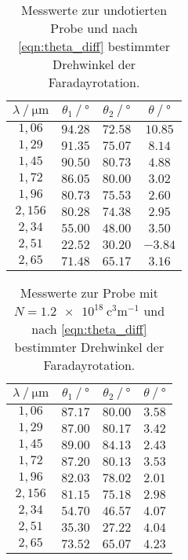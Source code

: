 \begin{table}
  \centering
  \caption{Messwerte zur undotierten Probe und nach \autoref{eqn:theta_diff} bestimmter Drehwinkel der Faradayrotation.}
  \label{tab:mw1}
  \begin{tabular}{c c c c}
    \toprule
    $\lambda \mathbin{/} \unit{\micro\meter}$ & $\theta_{1} \mathbin{/} \unit{\degree}$ & $\theta_{2} \mathbin{/} \unit{\degree}$ &%
     $\theta \mathbin{/} \unit{\degree}$ \\
    \midrule
    $1,06 $ & $94.28$ & $72.58$ & $10.85$ \\
    $1,29 $ & $91.35$ & $75.07$ & $8.14 $ \\
    $1,45 $ & $90.50$ & $80.73$ & $4.88 $ \\
    $1,72 $ & $86.05$ & $80.00$ & $3.02 $ \\
    $1,96 $ & $80.73$ & $75.53$ & $2.60 $ \\
    $2,156$ & $80.28$ & $74.38$ & $2.95 $ \\
    $2,34 $ & $55.00$ & $48.00$ & $3.50 $ \\
    $2,51 $ & $22.52$ & $30.20$ & $-3.84$ \\
    $2,65 $ & $71.48$ & $65.17$ & $3.16 $ \\
    \bottomrule
  \end{tabular}
\end{table}

\begin{table}
  \centering
  \caption{Messwerte zur Probe mit $N = \qty{1.2e18}{\cubic\centi\metre^{-1}}$ und nach \autoref{eqn:theta_diff} bestimmter Drehwinkel der Faradayrotation.}
  \label{tab:mw2}
  \begin{tabular}{c c c c}
    \toprule
    $\lambda \mathbin{/} \unit{\micro\meter}$ & $\theta_{1} \mathbin{/} \unit{\degree}$ & $\theta_{2} \mathbin{/} \unit{\degree}$ &%
     $\theta \mathbin{/} \unit{\degree}$ \\
    \midrule
    $1,06 $ & $87.17$ & $80.00$ & $3.58$ \\
    $1,29 $ & $87.00$ & $80.17$ & $3.42$ \\
    $1,45 $ & $89.00$ & $84.13$ & $2.43$ \\
    $1,72 $ & $87.20$ & $80.13$ & $3.53$ \\
    $1,96 $ & $82.03$ & $78.02$ & $2.01$ \\
    $2,156$ & $81.15$ & $75.18$ & $2.98$ \\
    $2,34 $ & $54.70$ & $46.57$ & $4.07$ \\
    $2,51 $ & $35.30$ & $27.22$ & $4.04$ \\
    $2,65 $ & $73.52$ & $65.07$ & $4.23$ \\
    \bottomrule
  \end{tabular}
\end{table}

